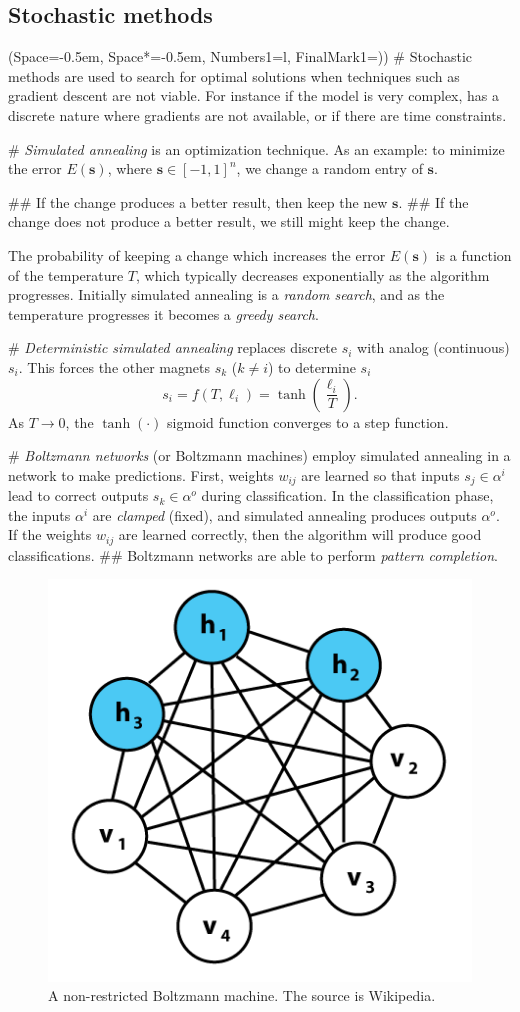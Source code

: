 \documentclass[12pt, a4paper]{article}
\newcommand{\listSpace}{-0.5em}%
\newcommand{\vect}[1]{\bm{#1}}
\begin{document}
\subsection{Stochastic methods}
\begin{easylist}[itemize]
\ListProperties(Space=\listSpace, Space*=\listSpace, Numbers1=l, FinalMark1={)})
# Stochastic methods are used to search for optimal solutions when techniques such as gradient descent are not viable.
For instance if the model is very complex, has a discrete nature where gradients are not available, or if there are time constraints.

# \emph{Simulated annealing} is an optimization technique.
As an example:
to minimize the error $E(\vect{s})$, where $\vect{s} \in [-1, 1]^n$, we change a random entry of $\vect{s}$.
\begin{easylist}
## If the change produces a better result, then keep the new $\vect{s}$.
## If the change does not produce a better result, we still might keep the change. 
\end{easylist}
The probability of keeping a change which increases the error $E(\vect{s})$ is a function of the temperature $T$, which typically decreases exponentially as the algorithm progresses.
Initially simulated annealing is a \emph{random search}, and as the temperature progresses it becomes a \emph{greedy search}.

# \emph{Deterministic simulated annealing} replaces discrete $s_i$ with analog (continuous) $s_i$.
This forces the other magnets $s_k$ ($k \neq i$) to determine $s_i$
\begin{equation*}
	s_i = f(T, \ell_i) = \tanh \left( \frac{\ell_i}{T} \right).
\end{equation*}
As $T \to 0$, the $\tanh (\cdot)$ sigmoid function converges to a step function.


# \emph{Boltzmann networks} (or Boltzmann machines) employ simulated annealing in a network to make predictions.
First, weights $w_{ij}$ are learned so that inputs $s_j \in \alpha^i$ lead to correct outputs $s_k \in \alpha^o$ during classification.
In the classification phase, the inputs $\alpha^i$ are \emph{clamped} (fixed), and simulated annealing produces outputs $\alpha^o$.
If the weights $w_{ij}$ are learned correctly, then the algorithm will produce good classifications.
## Boltzmann networks are able to perform \emph{pattern completion}. 

\begin{figure}[ht!]
	\centering
	\includegraphics[width=0.3\linewidth]{figs/boltzmann}
	\caption{A non-restricted Boltzmann machine. The source is Wikipedia.}
	\label{fig:boltzmann}
\end{figure}


\end{easylist}
\end{document}
